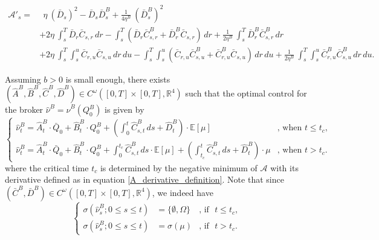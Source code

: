 \documentclass[10pt,a4paper]{amsart}
\begin{document}
\begin{equation}\label{A_derivative_definition}
    \begin{aligned}
        \mathcal{A}'_s = &~~ \eta~(\bar{D}_s)^2 - \bar{D}_s \bar{D}_s^B + \frac{1}{4\eta^B}~(\bar{D}_s^B)^2 \\
                      & + 2\eta~\int_s^T \bar{D}_r \bar{C}_{s,r} \, dr - \int_s^T (\bar{D}_r \bar{C}_{s,r}^B + \bar{D}_r^B \bar{C}_{s,r}) \, dr + \frac{1}{2\eta^B}~\int_s^T \bar{D}_r^B \bar{C}_{s,r}^B \, dr\\
                      & + 2\eta~ \int_s^T \int_s^u \bar{C}_{r,u} \bar{C}_{s,u} \, dr \, du - \int_s^T \int_s^u (\bar{C}_{r,u} \bar{C}^B_{s,u} + \bar{C}^B_{r,u} \bar{C}_{s,u}) \, dr \, du + \frac{1}{2\eta^B}~ \int_s^T \int_s^u \bar{C}^B_{r,u} \bar{C}^B_{s,u} \, dr \, du.
    \end{aligned}
\end{equation}

\begin{theorem}\label{best_control_for_broker}
    Assuming $b>0$ is small enough, there exists $(\hat{A}^B, \hat{B}^B, \hat{C}^B, \hat{D}^B) \in C^{\omega}([0,T] \times [0,T], \mathbb{R}^4)$ such that the optimal control for the broker $\hat{\nu}^B = \hat{\nu}^B(Q_0^B)$ is given by 
    \begin{equation}\label{hatnuB_solution}
        \left\{
        \begin{array}{ll}
            \hat{\nu}^B_t = \hat{A}^B_t \cdot \bar{Q}_0 + \hat{B}^B_t \cdot Q_0^B + \left(\int_0^t \hat{C}^B_{s,t} \, ds + \hat{D}^B_t \right) \cdot \mathbb{E}[\mu] & \text{, when~} t \leq t_c, \\
            \hat{\nu}^B_t = \hat{A}^B_t \cdot \bar{Q}_0 + \hat{B}^B_t \cdot Q_0^B + \int_0^{t_c} \hat{C}^B_{s,t} \, ds \cdot \mathbb{E}[\mu] + \left( \int_{t_c}^t \hat{C}^B_{s,t} \, ds + \hat{D}^B_t \right) \cdot \mu & \text{, when~} t > t_c.
        \end{array}
        \right.
    \end{equation}
    where the critical time $t_c$ is determined by the negative minimum of $\mathcal{A}$ with its derivative defined as in equation \eqref{A_derivative_definition}.
    Note that since $(\bar{C}^B, \bar{D}^B) \in C^{\omega}([0,T] \times [0,T], \mathbb{R}^4)$, we indeed have
    \begin{equation*}
        \left\{
        \begin{array}{lll}
            \sigma(\hat{\nu}^B_s; 0 \leq s \leq t) &= \{\emptyset,\Omega\} & \text{, if~~} t \leq t_c, \\ 
            \sigma(\hat{\nu}^B_s; 0 \leq s \leq t) &= \sigma(\mu) & \text{, if~~} t > t_c.
        \end{array}
        \right.
    \end{equation*}
\end{theorem}
\end{document}
